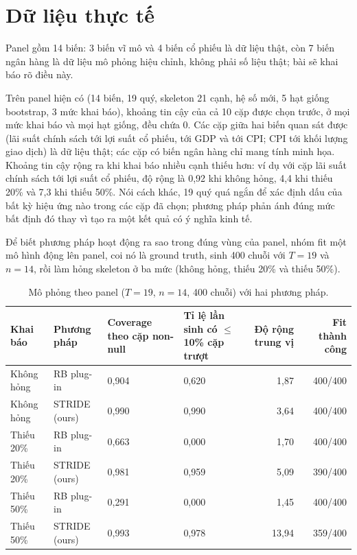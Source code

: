 \documentclass[11pt,a4paper]{article}
\begin{document}
\section{Dữ liệu thực tế}

Panel gồm 14 biến: 3 biến vĩ mô và 4 biến cổ phiếu là dữ liệu thật, còn 7 biến ngân hàng là dữ liệu mô phỏng hiệu chỉnh, không phải số liệu thật; bài sẽ khai báo rõ điều này.

Trên panel hiện có (14 biến, 19 quý, skeleton 21 cạnh, hệ số mới, 5 hạt giống bootstrap, 3 mức khai báo), khoảng tin cậy của cả 10 cặp được chọn trước, ở mọi mức khai báo và mọi hạt giống, đều chứa 0. Các cặp giữa hai biến quan sát được (lãi suất chính sách tới lợi suất cổ phiếu, tới GDP và tới CPI; CPI tới khối lượng giao dịch) là dữ liệu thật; các cặp có biến ngân hàng chỉ mang tính minh họa. Khoảng tin cậy rộng ra khi khai báo nhiều cạnh thiếu hơn: ví dụ với cặp lãi suất chính sách tới lợi suất cổ phiếu, độ rộng là 0,92 khi không hỏng, 4,4 khi thiếu 20\% và 7,3 khi thiếu 50\%. Nói cách khác, 19 quý quá ngắn để xác định dấu của bất kỳ hiệu ứng nào trong các cặp đã chọn; phương pháp phản ánh đúng mức bất định đó thay vì tạo ra một kết quả có ý nghĩa kinh tế.

Để biết phương pháp hoạt động ra sao trong đúng vùng của panel, nhóm fit một mô hình động lên panel, coi nó là ground truth, sinh 400 chuỗi với $T=19$ và $n=14$, rồi làm hỏng skeleton ở ba mức (không hỏng, thiếu 20\% và thiếu 50\%).

\begin{table}[H]
\centering
\caption{Mô phỏng theo panel ($T=19$, $n=14$, 400 chuỗi) với hai phương pháp.}\label{tab:panel}
{\small
\begin{tabular}{llp{2.3cm}p{2.9cm}rr}
\toprule
Khai báo & Phương pháp & Coverage theo cặp non-null & Tỉ lệ lần sinh có $\leq$10\% cặp trượt & Độ rộng trung vị & Fit thành công \\
\midrule
Không hỏng & RB plug-in & 0,904 & 0,620 & 1,87 & 400/400 \\
Không hỏng & STRIDE (ours) & 0,990 & 0,990 & 3,64 & 400/400 \\
Thiếu 20\% & RB plug-in & 0,663 & 0,000 & 1,70 & 400/400 \\
Thiếu 20\% & STRIDE (ours) & 0,981 & 0,959 & 5,09 & 390/400 \\
Thiếu 50\% & RB plug-in & 0,291 & 0,000 & 1,45 & 400/400 \\
Thiếu 50\% & STRIDE (ours) & 0,993 & 0,978 & 13,94 & 359/400 \\
\bottomrule
\end{tabular}
}
\end{table}
\end{document}
